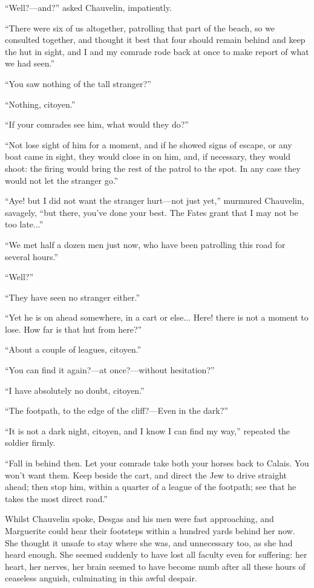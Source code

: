 \documentclass[paper=a5,BCOR=7mm,twoside,DIV=calc,12pt,usegeometry,chapterprefix,endperiod,headings=big]{scrbook}
\begin{document}
\enquote{Well?---and?} asked Chauvelin, impatiently.

\enquote{There were six of us altogether, patrolling that part of the beach, so we consulted together, and thought it best that four should remain behind and keep the hut in sight, and I and my comrade rode back at once to make report of what we had seen.}

\enquote{You saw nothing of the tall stranger?}

\enquote{Nothing, citoyen.}

\enquote{If your comrades see him, what would they do?}

\enquote{Not lose sight of him for a moment, and if he showed signs of escape, or any boat came in sight, they would close in on him, and, if necessary, they would shoot: the firing would bring the rest of the patrol to the spot. In any case they would not let the stranger go.}

\enquote{Aye! but I did not want the stranger hurt---not just yet,} murmured Chauvelin, savagely, \enquote{but there, you've done your best. The Fates grant that I may not be too late...}

\enquote{We met half a dozen men just now, who have been patrolling this road for several hours.}

\enquote{Well?}

\enquote{They have seen no stranger either.}

\enquote{Yet he is on ahead somewhere, in a cart or else... Here! there is not a moment to lose. How far is that hut from here?}

\enquote{About a couple of leagues, citoyen.}

\enquote{You can find it again?---at once?---without hesitation?}

\enquote{I have absolutely no doubt, citoyen.}

\enquote{The footpath, to the edge of the cliff?---Even in the dark?}

\enquote{It is not a dark night, citoyen, and I know I can find my way,} repeated the soldier firmly.

\enquote{Fall in behind then. Let your comrade take both your horses back to Calais. You won't want them. Keep beside the cart, and direct the Jew to drive straight ahead; then stop him, within a quarter of a league of the footpath; see that he takes the most direct road.}

Whilst Chauvelin spoke, Desgas and his men were fast approaching, and Marguerite could hear their footsteps within a hundred yards behind her now. She thought it unsafe to stay where she was, and unnecessary too, as she had heard enough. She seemed suddenly to have lost all faculty even for suffering: her heart, her nerves, her brain seemed to have become numb after all these hours of ceaseless anguish, culminating in this awful despair.
\end{document}
